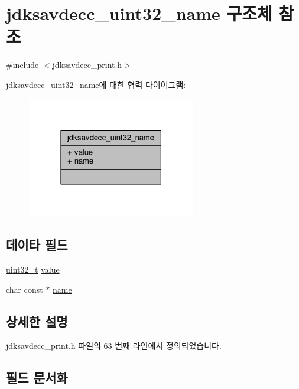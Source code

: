 \hypertarget{structjdksavdecc__uint32__name}{}\section{jdksavdecc\+\_\+uint32\+\_\+name 구조체 참조}
\label{structjdksavdecc__uint32__name}


{\ttfamily \#include $<$jdksavdecc\+\_\+print.\+h$>$}



jdksavdecc\+\_\+uint32\+\_\+name에 대한 협력 다이어그램\+:
\nopagebreak
\begin{figure}[H]
\begin{center}
\leavevmode
\includegraphics[width=207pt]{structjdksavdecc__uint32__name__coll__graph}
\end{center}
\end{figure}
\subsection*{데이타 필드}
\begin{DoxyCompactItemize}
\item 
\hyperlink{parse_8c_a6eb1e68cc391dd753bc8ce896dbb8315}{uint32\+\_\+t} \hyperlink{structjdksavdecc__uint32__name_ae7f66047e6e39ba2bb6af8b95f00d1dd}{value}
\item 
char const $\ast$ \hyperlink{structjdksavdecc__uint32__name_a5f1de76dd5d451949e12c0fbc966ca70}{name}
\end{DoxyCompactItemize}


\subsection{상세한 설명}


jdksavdecc\+\_\+print.\+h 파일의 63 번째 라인에서 정의되었습니다.



\subsection{필드 문서화}
